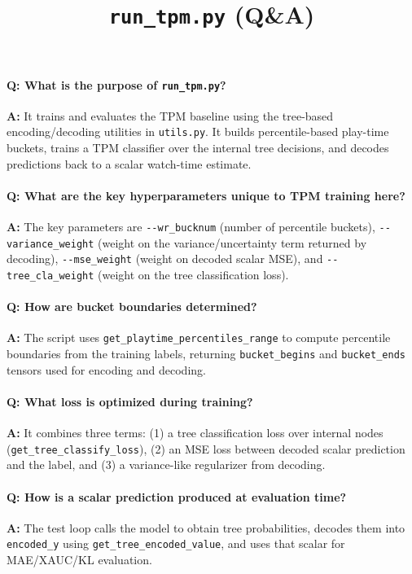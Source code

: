 \documentclass[11pt]{article}
\title{\texttt{run\_tpm.py} (Q\&A)}
\author{}
\date{}
\begin{document}
\maketitle

\paragraph{Q: What is the purpose of \texttt{run\_tpm.py}?}
\textbf{A:} It trains and evaluates the TPM baseline using the tree-based encoding/decoding utilities in \lstinline|utils.py|. It builds percentile-based play-time buckets, trains a TPM classifier over the internal tree decisions, and decodes predictions back to a scalar watch-time estimate.

\paragraph{Q: What are the key hyperparameters unique to TPM training here?}
\textbf{A:} The key parameters are \lstinline|--wr_bucknum| (number of percentile buckets), \lstinline|--variance_weight| (weight on the variance/uncertainty term returned by decoding), \lstinline|--mse_weight| (weight on decoded scalar MSE), and \lstinline|--tree_cla_weight| (weight on the tree classification loss).

\paragraph{Q: How are bucket boundaries determined?}
\textbf{A:} The script uses \lstinline|get_playtime_percentiles_range| to compute percentile boundaries from the training labels, returning \lstinline|bucket_begins| and \lstinline|bucket_ends| tensors used for encoding and decoding.

\paragraph{Q: What loss is optimized during training?}
\textbf{A:} It combines three terms: (1) a tree classification loss over internal nodes (\lstinline|get_tree_classify_loss|), (2) an MSE loss between decoded scalar prediction and the label, and (3) a variance-like regularizer from decoding.

\paragraph{Q: How is a scalar prediction produced at evaluation time?}
\textbf{A:} The test loop calls the model to obtain tree probabilities, decodes them into \lstinline|encoded_y| using \lstinline|get_tree_encoded_value|, and uses that scalar for MAE/XAUC/KL evaluation.
\end{document}
